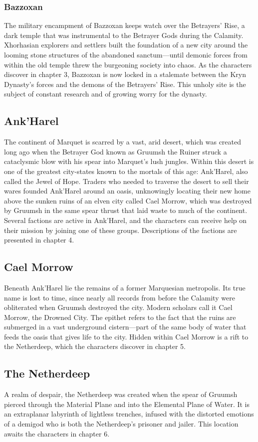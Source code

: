 \documentclass[10pt,a4paper,twoside,bg=print,twocolumn,openany,nodeprecatedcode]{dndbook}
\begin{document}
\subsubsection{Bazzoxan}
The military encampment of Bazzoxan keeps watch over the Betrayers' Rise, a dark temple that was instrumental to the Betrayer Gods during the Calamity. Xhorhasian explorers and settlers built the foundation of a new city around the looming stone structures of the abandoned sanctum—until demonic forces from within the old temple threw the burgeoning society into chaos.
As the characters discover in chapter 3, Bazzoxan is now locked in a stalemate between the Kryn Dynasty's forces and the demons of the Betrayers' Rise. This unholy site is the subject of constant research and of growing worry for the dynasty.
\subsection{Ank'Harel}
The continent of Marquet is scarred by a vast, arid desert, which was created long ago when the Betrayer God known as Gruumsh the Ruiner struck a cataclysmic blow with his spear into Marquet's lush jungles. Within this desert is one of the greatest city-states known to the mortals of this age: Ank'Harel, also called the Jewel of Hope.
Traders who needed to traverse the desert to sell their wares founded Ank'Harel around an oasis, unknowingly locating their new home above the sunken ruins of an elven city called Cael Morrow, which was destroyed by Gruumsh in the same spear thrust that laid waste to much of the continent.
Several factions are active in Ank'Harel, and the characters can receive help on their mission by joining one of these groups. Descriptions of the factions are presented in chapter 4.
\subsection{Cael Morrow}
Beneath Ank'Harel lie the remains of a former Marquesian metropolis. Its true name is lost to time, since nearly all records from before the Calamity were obliterated when Gruumsh destroyed the city. Modern scholars call it Cael Morrow, the Drowned City. The epithet refers to the fact that the ruins are submerged in a vast underground cistern—part of the same body of water that feeds the oasis that gives life to the city.
Hidden within Cael Morrow is a rift to the Netherdeep, which the characters discover in chapter 5.
\subsection{The Netherdeep}
A realm of despair, the Netherdeep was created when the spear of Gruumsh pierced through the Material Plane and into the Elemental Plane of Water. It is an extraplanar labyrinth of lightless trenches, infused with the distorted emotions of a demigod who is both the Netherdeep's prisoner and jailer. This location awaits the characters in chapter 6.
\end{document}
